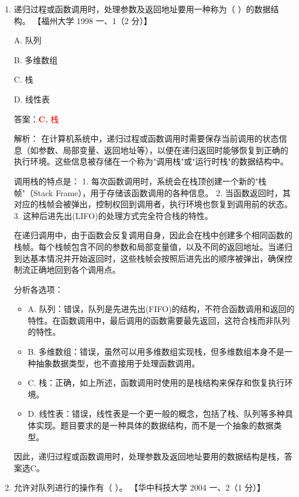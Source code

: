 \documentclass[lang=cn,newtx,10pt,scheme=chinese]{../../../elegantbook}
\begin{document}
\begin{enumerate}
    \item 递归过程或函数调用时，处理参数及返回地址要用一种称为（ ）的数据结构。  
    【福州大学 1998 一、1（2 分）】  

    A. 队列  

    B. 多维数组  

    C. 栈  

    D. 线性表  

    答案：\textcolor{red}{\textbf{C.} 栈}

    解析：
    在计算机系统中，递归过程或函数调用时需要保存当前调用的状态信息（如参数、局部变量、返回地址等），以便在递归返回时能够恢复到正确的执行环境。这些信息被存储在一个称为"调用栈"或"运行时栈"的数据结构中。

    调用栈的特点是：
    1. 每次函数调用时，系统会在栈顶创建一个新的"栈帧"（Stack Frame），用于存储该函数调用的各种信息。
    2. 当函数返回时，其对应的栈帧会被弹出，控制权回到调用者，执行环境也恢复到调用前的状态。
    3. 这种后进先出(LIFO)的处理方式完全符合栈的特性。

    在递归调用中，由于函数会反复调用自身，因此会在栈中创建多个相同函数的栈帧。每个栈帧包含不同的参数和局部变量值，以及不同的返回地址。当递归到达基本情况并开始返回时，这些栈帧会按照后进先出的顺序被弹出，确保控制流正确地回到各个调用点。

    分析各选项：
    \begin{itemize}
        \item A. 队列：错误，队列是先进先出(FIFO)的结构，不符合函数调用和返回的特性。在函数调用中，最后调用的函数需要最先返回，这符合栈而非队列的特性。
        
        \item B. 多维数组：错误，虽然可以用多维数组实现栈，但多维数组本身不是一种抽象数据类型，也不直接用于处理函数调用。
        
        \item C. 栈：正确，如上所述，函数调用时使用的是栈结构来保存和恢复执行环境。
        
        \item D. 线性表：错误，线性表是一个更一般的概念，包括了栈、队列等多种具体实现。题目要求的是一种具体的数据结构，而不是一个抽象的数据类型。
    \end{itemize}

    因此，递归过程或函数调用时，处理参数及返回地址要用的数据结构是栈，答案选C。

    \item 允许对队列进行的操作有（ ）。  
    【华中科技大学 2004 一、2（1 分）】  


\end{enumerate}
\end{document}
